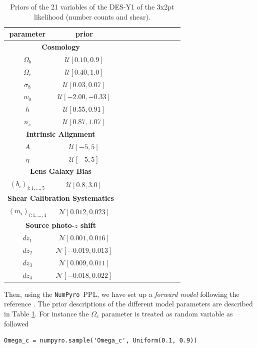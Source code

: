\documentclass[twocolumn,twocolappendix,nofootinbib,iop]{openjournal}
\newcommand{\numpyro}{\texttt{NumPyro}}
\begin{document}
\begin{table}[htb]
\caption{Priors of the 21 variables of the DES-Y1 of the 3x2pt likelihood (number counts and shear).}
\label{tab-DESY1}
 \centering
\begin{tabular}{ccccccccccc}
\hline
 parameter &  prior \\
 \hline
  \multicolumn{2}{c}{\textbf{Cosmology}} \\
$\Omega_b$ & $\mathcal{U}[0.10, 0.9]$ \\
$\Omega_c$ & $\mathcal{U}[0.40, 1.0]$ \\
$\sigma_8$ & $\mathcal{U}[0.03, 0.07]$ \\
$w_0$ & $\mathcal{U}[-2.00, -0.33]$ \\
$h$ & $\mathcal{U}[0.55, 0.91]$ \\
$n_s$ & $\mathcal{U}[0.87, 1.07]$ \\
\multicolumn{2}{c}{\textbf{Intrinsic Alignment}} \\
$A$ & $\mathcal{U}[-5,5]$ \\
$\eta$ &$\mathcal{U}[-5,5]$ \\
\multicolumn{2}{c}{\textbf{Lens Galaxy Bias}} \\
$(b_i)_{i:1,\dots,5}$ & $\mathcal{U}[0.8,3.0]$ \\
\multicolumn{2}{c}{\textbf{Shear Calibration Systematics}} \\
$(m_i)_{i:1,\dots,4}$ & $\mathcal{N}[0.012,0.023]$ \\
\multicolumn{2}{c}{\textbf{Source photo-$z$ shift}} \\
$dz_1$ & $\mathcal{N}[0.001,0.016]$ \\
$dz_2$ & $\mathcal{N}[-0.019,0.013]$ \\
$dz_3$ & $\mathcal{N}[0.009,0.011]$ \\
$dz_4$ & $\mathcal{N}[-0.018,0.022]$ \\
\hline
\end{tabular}
\end{table}


Then, using the \numpyro\ PPL, we have set up a \textit{forward model} following the reference \citep{2018PhRvD..98d3526A}. The prior descriptions of the different model parameters are described in Table \ref{tab-DESY1}.  For instance the $\Omega_c$ parameter is treated as random variable as followed
\begin{lstlisting}[language=iPython]
Omega_c = numpyro.sample('Omega_c', Uniform(0.1, 0.9))
\end{lstlisting}
\end{document}
